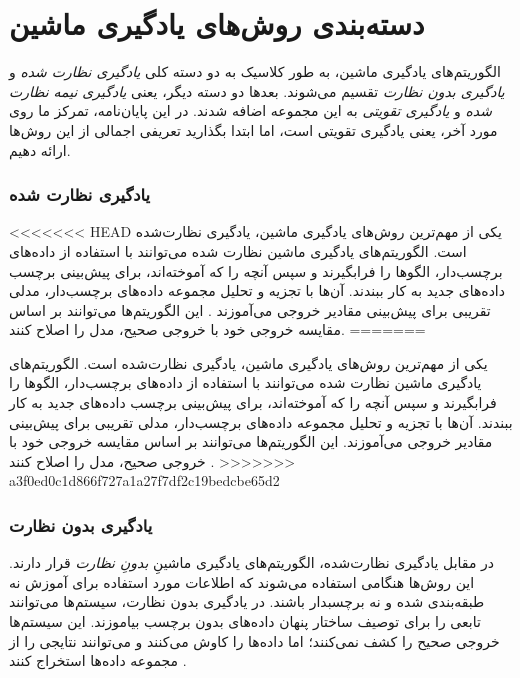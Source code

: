 \section{دسته‌بندی روش‌های یادگیری ماشین}
الگوریتم‌های یادگیری ماشین، به طور کلاسیک به دو دسته کلی 
\textit{یادگیری نظارت شده}
و 
\textit{یادگیری بدون نظارت}
تقسیم می‌شوند. بعدها دو دسته دیگر، یعنی 
\textit{یادگیری نیمه نظارت شده}
و
\textit{یادگیری تقویتی} 
  به این مجموعه اضافه شدند. در این پایان‌نامه، تمرکز ما روی مورد آخر، یعنی یادگیری تقویتی است، اما ابتدا بگذارید تعریفی اجمالی از این روش‌ها ارائه دهیم.
\subsubsection{یادگیری نظارت شده}
<<<<<<< HEAD
یکی از مهم‌ترین روش‌های یادگیری ماشین، یادگیری نظارت‌شده است. الگوریتم‌های یادگیری ماشین نظارت ‌شده می‌توانند  با استفاده از داده‌های برچسب‌دار، الگوها را فرابگیرند و سپس آنچه را که آموخته‌اند، برای پیش‌بینی برچسب داده‌های جدید به کار ببندند.
آن‌ها با تجزیه و تحلیل مجموعه داده‌های برچسب‌دار، مدلی تقریبی برای پیش‌بینی مقادیر خروجی می‌‌آموزند \cite{mldef}. این الگوریتم‌ها می‌توانند بر اساس مقایسه خروجی خود با خروجی صحیح، مدل را اصلاح کنند.
=======

یکی از مهم‌ترین روش‌های یادگیری ماشین، یادگیری نظارت‌شده است. الگوریتم‌های یادگیری ماشین نظارت ‌شده می‌توانند  با استفاده از داده‌های برچسب‌دار، الگوها را فرابگیرند و سپس آنچه را که آموخته‌اند، برای پیش‌بینی برچسب داده‌های جدید به کار ببندند.
آن‌ها با تجزیه و تحلیل مجموعه داده‌های برچسب‌دار، مدلی تقریبی برای پیش‌بینی مقادیر خروجی می‌‌آموزند. این الگوریتم‌ها می‌توانند بر اساس مقایسه خروجی خود با خروجی صحیح، مدل را اصلاح کنند
\cite{mldef}.
>>>>>>> a3f0ed0c1d866f727a1a27f7df2c19bedcbe65d2
\subsubsection{یادگیری بدون نظارت}
در مقابل  یادگیری نظارت‌شده، الگوریتم‌های یادگیری ماشینِ
\textit{بدونِ نظارت} 
قرار دارند. این روش‌ها هنگامی‌ استفاده می‌شوند که اطلاعات مورد استفاده برای آموزش نه طبقه‌بندی شده و  نه برچسب\nf دار باشند. در یادگیری بدون نظارت، سیستم‌ها می‌توانند تابعی را برای توصیف ساختار پنهان داده‌های بدون برچسب بیاموزند. این سیستم‌ها خروجی صحیح را کشف نمی‌کنند؛ اما داده‌ها را کاوش می‌کنند و می‌توانند نتایجی را از مجموعه داده‌ها استخراج کنند
\cite{mldef}.


